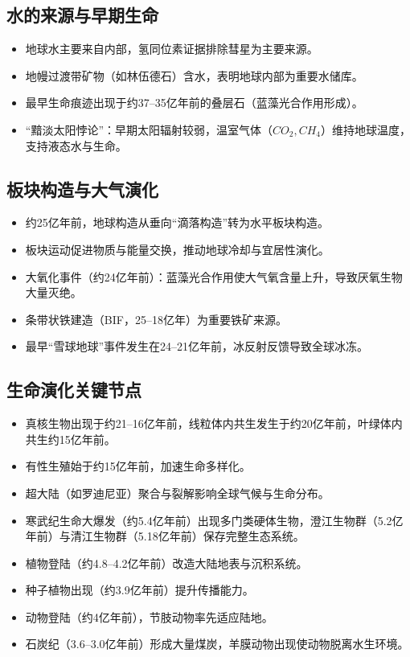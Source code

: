 \documentclass[12pt,a4paper]{article}
\begin{document}
	\subsection{水的来源与早期生命}
	\begin{itemize}
		\item 地球水主要来自内部，氢同位素证据排除彗星为主要来源。
		\item 地幔过渡带矿物（如林伍德石）含水，表明地球内部为重要水储库。
		\item 最早生命痕迹出现于约37–35亿年前的叠层石（蓝藻光合作用形成）。
		\item “黯淡太阳悖论”：早期太阳辐射较弱，温室气体（$CO_2, CH_4$）维持地球温度，支持液态水与生命。
	\end{itemize}
	
	\subsection{板块构造与大气演化}
	\begin{itemize}
		\item 约25亿年前，地球构造从垂向“滴落构造”转为水平板块构造。
		\item 板块运动促进物质与能量交换，推动地球冷却与宜居性演化。
		\item 大氧化事件（约24亿年前）：蓝藻光合作用使大气氧含量上升，导致厌氧生物大量灭绝。
		\item 条带状铁建造（BIF，25–18亿年）为重要铁矿来源。
		\item 最早“雪球地球”事件发生在24–21亿年前，冰反射反馈导致全球冰冻。
	\end{itemize}
	
	\subsection{生命演化关键节点}
	\begin{itemize}
		\item 真核生物出现于约21–16亿年前，线粒体内共生发生于约20亿年前，叶绿体内共生约15亿年前。
		\item 有性生殖始于约15亿年前，加速生命多样化。
		\item 超大陆（如罗迪尼亚）聚合与裂解影响全球气候与生命分布。
		\item 寒武纪生命大爆发（约5.4亿年前）出现多门类硬体生物，澄江生物群（5.2亿年前）与清江生物群（5.18亿年前）保存完整生态系统。
		\item 植物登陆（约4.8–4.2亿年前）改造大陆地表与沉积系统。
		\item 种子植物出现（约3.9亿年前）提升传播能力。
		\item 动物登陆（约4亿年前），节肢动物率先适应陆地。
		\item 石炭纪（3.6–3.0亿年前）形成大量煤炭，羊膜动物出现使动物脱离水生环境。
	\end{itemize}
	
\end{document}
